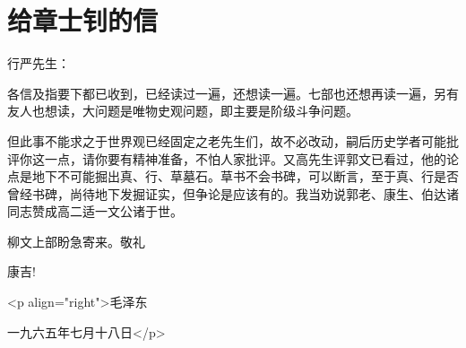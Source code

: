 \section[给章士钊的信（一九六五年七月十八日）]{给章士钊的信}


行严先生：

各信及指要下都已收到，已经读过一遍，还想读一遍。七部也还想再读一遍，另有友人也想读，大问题是唯物史观问题，即主要是阶级斗争问题。

但此事不能求之于世界观已经固定之老先生们，故不必改动，嗣后历史学者可能批评你这一点，请你要有精神准备，不怕人家批评。又高先生评郭文已看过，他的论点是地下不可能掘出真、行、草墓石。草书不会书碑，可以断言，至于真、行是否曾经书碑，尚待地下发掘证实，但争论是应该有的。我当劝说郭老、康生、伯达诸同志赞成高二适一文公诸于世。

柳文上部盼急寄来。敬礼

康吉!

<p align="right">毛泽东

一九六五年七月十八日</p>


